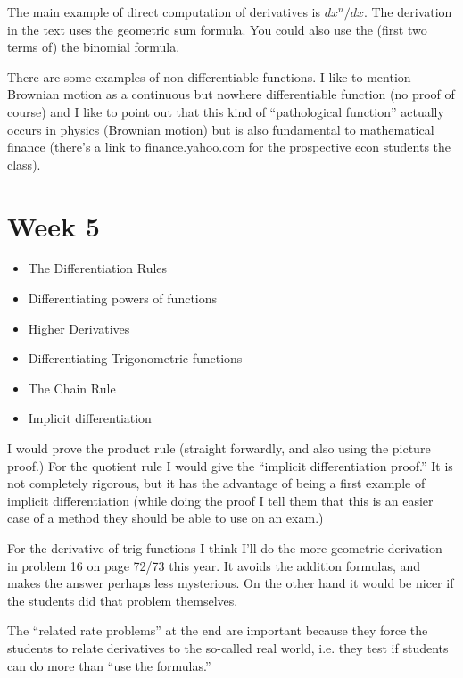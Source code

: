 \documentclass{amsproc}
\begin{document}
The main example of direct computation of derivatives is $dx^n/dx$.  The
derivation in the text uses the geometric sum formula.  You could also use the
(first two terms of) the binomial formula.  

There are some examples of non differentiable functions.  I like to mention
Brownian motion as a continuous but nowhere differentiable function (no proof of
course) and I like to point out that this kind of ``pathological function''
actually occurs in physics (Brownian motion) but is also fundamental to
mathematical finance (there's a link to finance.yahoo.com for the prospective econ
students the class).

\section*{Week 5}
\begin{itemize}
\item The Differentiation Rules
\item Differentiating powers of functions
\item Higher Derivatives
\item Differentiating Trigonometric functions
\item The Chain Rule
\item Implicit differentiation
\end{itemize}
I would prove the product rule (straight forwardly, and also using the picture
proof.) For the quotient rule I would give the ``implicit differentiation
proof.''  It is not completely rigorous, but it has the advantage of being a
first example of implicit differentiation (while doing the proof I tell them
that this is an easier case of a method they should be able to use on an exam.)

For the derivative of trig functions I think I'll do the more geometric
derivation in problem 16 on page 72/73 this year.  It avoids the addition
formulas, and makes the answer perhaps less mysterious.   On the other hand it
would be nicer if the students did that problem themselves.

The ``related rate problems'' at the end are important because they force the
students to relate derivatives to the so-called real world, i.e. they test if
students can do more than ``use the formulas.''
\end{document}
